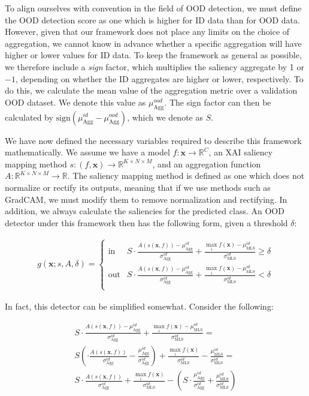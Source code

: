 \documentclass[runningheads]{llncs}
\newcommand{\R}{\mathbb{R}}
\begin{document}
To align ourselves with convention in the field of OOD detection, we must define the OOD detection score as one which is higher for ID data than for OOD data. However, given that our framework does not place any limits on the choice of aggregation, we cannot know in advance whether a specific aggregation will have higher or lower values for ID data. To keep the framework as general as possible, we therefore include a {\it sign} factor, which multiplies the saliency aggregate by 1 or $-1$, depending on whether the ID aggregates are higher or lower, respectively. To do this, we calculate the mean value of the aggregation metric over a validation OOD dataset. We denote this value as $\mu_{\text{Agg}}^{ood}$. The sign factor can then be calculated by $\text{sign}(\mu_{\text{Agg}}^{id} - \mu_{\text{Agg}}^{ood})$, which we denote as $S$.

We have now defined the necessary variables required to describe this framework mathematically. We assume we have a model $f: \bm{x} \to \R^C$, an XAI saliency mapping method $s: (f, \bm{x}) \to \R^{K \times N \times M}$, and an aggregation function $A: \R^{K \times N \times M} \rightarrow \R$. The saliency mapping method is defined as one which does not normalize or rectify its outputs, meaning that if we use methods such as GradCAM, we must modify them to remove normalization and rectifying. In addition, we always calculate the saliencies for the predicted class. An OOD detector under this framework then has the following form, given a threshold $\delta$:

{\large
\begin{align}
    g(\bm{x}; s, A, \delta)=\begin{cases}
    \text{in } &  S \cdot \frac{A(s(\bm{x}, f)) - \mu_{\text{Agg}}^{id}}{\sigma_{\text{Agg}}^{id}} + \frac{\max_i f(\bm{x}) - \mu_{\text{MLS}}^{id}}{\sigma_{\text{MLS}}^{id}} \ge \delta \\[10pt]
    \text{out} &  S \cdot \frac{A(s(\bm{x}, f)) - \mu_{\text{Agg}}^{id}}{\sigma_{\text{Agg}}^{id}} + \frac{\max_i f(\bm{x}) - \mu_{\text{MLS}}^{id}}{\sigma_{\text{MLS}}^{id}} < \delta \\
   \end{cases}
\label{eq:salagg_def}
\end{align}
}

\noindent In fact, this detector can be simplified somewhat. Consider the following:

\begin{gather}
S \cdot \frac{A(s(\bm{x}, f)) - \mu_{\text{Agg}}^{id}}{\sigma_{\text{Agg}}^{id}} + \frac{\max_i f(\bm{x}) - \mu_{\text{MLS}}^{id}}{\sigma_{\text{MLS}}^{id}} = \\
S \left( \cdot \frac{A(s(\bm{x}, f))}{\sigma_{\text{Agg}}^{id}} - \frac{\mu_{\text{Agg}}^{id}}{\sigma_{\text{Agg}}^{id}} \right) + \frac{\max_i f(\bm{x})}{\sigma_{\text{MLS}}^{id}} - \frac{\mu_{\text{MLS}}^{id}}{\sigma_{\text{MLS}}^{id}} = \\
S \cdot \frac{A(s(\bm{x}, f))}{\sigma_{\text{Agg}}^{id}} + \frac{\max_i f(\bm{x})}{\sigma_{\text{MLS}}^{id}} - \left(S \cdot \frac{\mu_{\text{Agg}}^{id}}{\sigma_{\text{Agg}}^{id}} + \frac{\mu_{\text{MLS}}^{id}}{\sigma_{\text{MLS}}^{id}} \right)
\end{gather}
\end{document}
